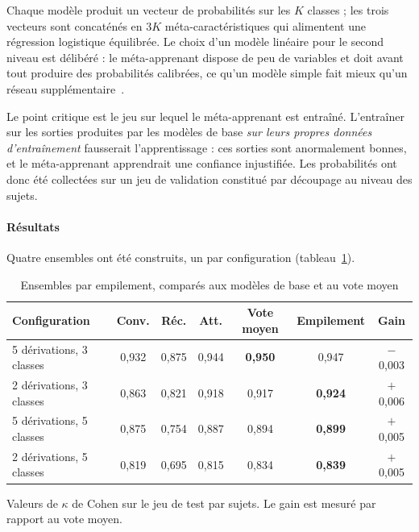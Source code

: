 Chaque modèle produit un vecteur de probabilités sur les $K$ classes ; les trois vecteurs
sont concaténés en $3K$ méta-caractéristiques qui alimentent une régression logistique
équilibrée. Le choix d'un modèle linéaire pour le second niveau est délibéré :
le méta-apprenant dispose de peu de variables et doit avant tout produire
des probabilités calibrées, ce qu'un modèle simple fait mieux qu'un réseau
supplémentaire~\cite{ting1999}.

Le point critique est le jeu sur lequel le méta-apprenant est entraîné. L'entraîner sur
les sorties produites par les modèles de base \emph{sur leurs propres données
d'entraînement} fausserait l'apprentissage : ces sorties sont anormalement bonnes, et
le méta-apprenant apprendrait une confiance injustifiée. Les probabilités ont donc été
collectées sur un jeu de validation constitué par découpage au niveau des sujets.

\paragraph{Résultats}

Quatre ensembles ont été construits, un par configuration (tableau~\ref{tab:ensembles}).

\begin{table}[H]
\centering

\small
\begin{tabular}{@{}lcccccc@{}}
\toprule
\textbf{Configuration} & \textbf{Conv.} & \textbf{Réc.} & \textbf{Att.} &
\textbf{Vote moyen} & \textbf{Empilement} & \textbf{Gain} \\
\midrule
5 dérivations, 3 classes & 0,932 & 0,875 & 0,944 & \textbf{0,950} & 0,947 &
\textcolor{hypnored}{$-$0,003} \\
2 dérivations, 3 classes & 0,863 & 0,821 & 0,918 & 0,917 & \textbf{0,924} & $+$0,006 \\
5 dérivations, 5 classes & 0,875 & 0,754 & 0,887 & 0,894 & \textbf{0,899} & $+$0,005 \\
2 dérivations, 5 classes & 0,819 & 0,695 & 0,815 & 0,834 & \textbf{0,839} & $+$0,005 \\
\bottomrule
\end{tabular}\par
\vspace{2pt}
\raggedright\footnotesize
Valeurs de $\kappa$ de Cohen sur le jeu de test par sujets. Le gain est mesuré par
rapport au vote moyen.
\caption{Ensembles par empilement, comparés aux modèles de base et au vote moyen}
\label{tab:ensembles}
\end{table}

